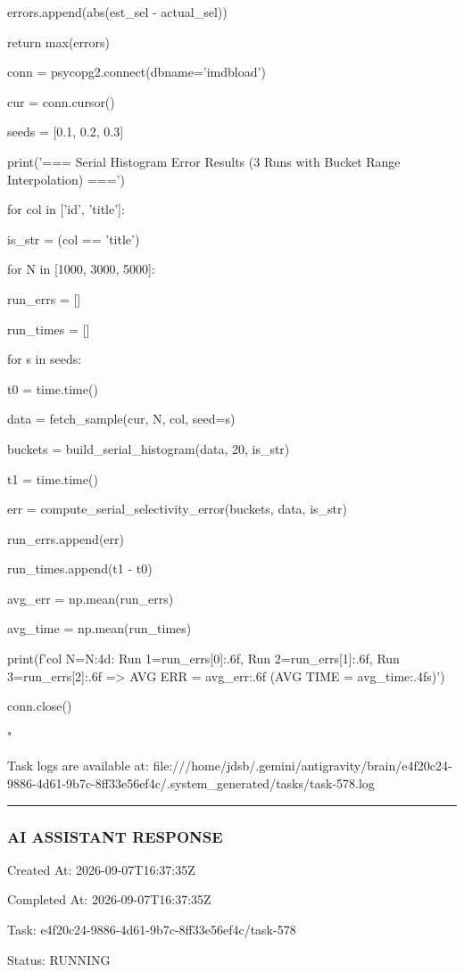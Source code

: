 \documentclass[11pt,a4paper]{article}
\begin{document}
errors.append(abs(est\_sel - actual\_sel))


return max(errors)


conn = psycopg2.connect(dbname='imdbload')

cur = conn.cursor()


seeds = [0.1, 0.2, 0.3]

print('=== Serial Histogram Error Results (3 Runs with Bucket Range Interpolation) ===')

for col in ['id', 'title']:

is\_str = (col == 'title')

for N in [1000, 3000, 5000]:

run\_errs = []

run\_times = []

for s in seeds:

t0 = time.time()

data = fetch\_sample(cur, N, col, seed=s)

buckets = build\_serial\_histogram(data, 20, is\_str)

t1 = time.time()

err = compute\_serial\_selectivity\_error(buckets, data, is\_str)

run\_errs.append(err)

run\_times.append(t1 - t0)

avg\_err = np.mean(run\_errs)

avg\_time = np.mean(run\_times)

print(f'{col} N={N:4d}: Run 1={run\_errs[0]:.6f}, Run 2={run\_errs[1]:.6f}, Run 3={run\_errs[2]:.6f} => AVG ERR = {avg\_err:.6f} (AVG TIME = {avg\_time:.4f}s)')


conn.close()

"

Task logs are available at: file:///home/jdsb/.gemini/antigravity/brain/e4f20c24-9886-4d61-9b7c-8ff33e56ef4c/.system\_generated/tasks/task-578.log


\hrule

\subsubsection{AI ASSISTANT RESPONSE}

Created At: 2026-09-07T16:37:35Z

Completed At: 2026-09-07T16:37:35Z

Task: e4f20c24-9886-4d61-9b7c-8ff33e56ef4c/task-578

Status: RUNNING
\end{document}
